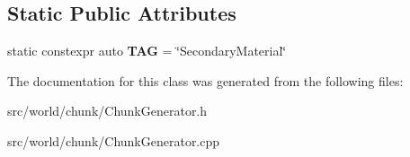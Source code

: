 \subsection*{Static Public Attributes}
\begin{DoxyCompactItemize}
\item 
\hypertarget{classSecondaryMaterial_ad4c8f6f600a842aa530af1bed2913343}{static constexpr auto {\bfseries T\-A\-G} = \char`\"{}Secondary\-Material\char`\"{}}\label{classSecondaryMaterial_ad4c8f6f600a842aa530af1bed2913343}

\end{DoxyCompactItemize}


The documentation for this class was generated from the following files\-:\begin{DoxyCompactItemize}
\item 
src/world/chunk/Chunk\-Generator.\-h\item 
src/world/chunk/Chunk\-Generator.\-cpp\end{DoxyCompactItemize}
